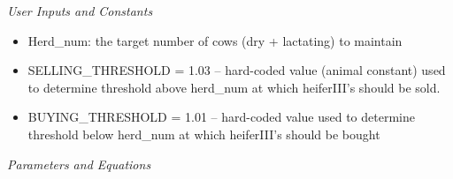 \documentclass{article}
\begin{document}
\begin{refsection}
         \textit{User Inputs and Constants}
         \vspace{0.1cm}
         
         \begin{itemize}
             \item Herd\_num: the target number of cows (dry + lactating) to maintain 
             \item SELLING\_THRESHOLD = 1.03 – hard-coded value (animal constant) used to determine threshold above herd\_num at which heiferIII’s should be sold. 
             \item BUYING\_THRESHOLD = 1.01 – hard-coded value used to determine threshold below herd\_num at which heiferIII’s should be bought

         \end{itemize}

         \textit{Parameters and Equations}
         \vspace{0.1cm}


\end{refsection}
\end{document}
